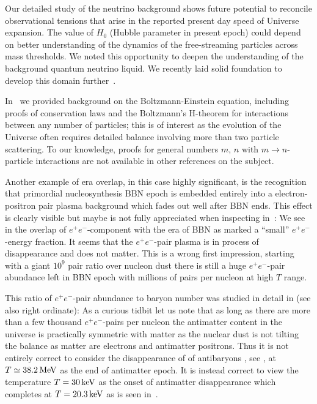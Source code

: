 Our detailed study of the neutrino background shows future potential to reconcile observational tensions that arise in the reported present day speed of Universe expansion. The value of $H_0$ (Hubble parameter in present epoch) could depend on better understanding of the dynamics of the free-streaming particles across mass thresholds. We noted this opportunity to deepen the understanding of the background quantum neutrino liquid. We recently laid solid foundation to develop this domain further~\cite{Birrell:2024bdb}.

In~ we provided background on the Boltzmann-Einstein equation, including proofs of conservation laws and the Boltzmann's H-theorem for interactions between any number of particles; this is of interest as the evolution of the Universe often requires detailed balance involving more than two particle scattering. To our knowledge, proofs for general numbers $m$, $n$ with $m\to n$-particle interactions are not available in other references on the subject.

Another example of era overlap, in this case highly significant, is the recognition that primordial nucleosynthesis BBN epoch is embedded entirely into a electron-positron pair plasma background which fades out well after BBN ends. This effect is clearly visible but maybe is not fully appreciated when inspecting in~: We see in the overlap of $e^+e^-$-component with the era of BBN as marked a ``small'' $e^+e^-$-energy fraction. It seems that the $e^+e^-$-pair plasma is in process of disappearance and does not matter. This is a wrong first impression,  starting with a giant $10^9$ pair ratio over nucleon dust there is still a huge $e^+e^-$-pair abundance left in BBN epoch with millions of pairs per nucleon at high $T$ range.

This ratio of $e^+e^-$-pair abundance to baryon number was studied  in detail in  (see also   right ordinate):  As a curious tidbit let us note that as long as there are more than a few thousand $e^+e^-$-pairs per nucleon the antimatter content in the universe is practically symmetric with matter as the nuclear dust is not tilting the balance as matter are electrons and antimatter positrons. Thus it is not entirely correct to consider the disappearance of of antibaryons , see , at $T\simeq 38.2\text{\,MeV}$ as the end of antimatter epoch. It is instead correct to view the temperature $T=30\text{\,keV}$ as the onset of antimatter disappearance which completes at $T=20.3\text{\,keV}$ as is seen in~.

